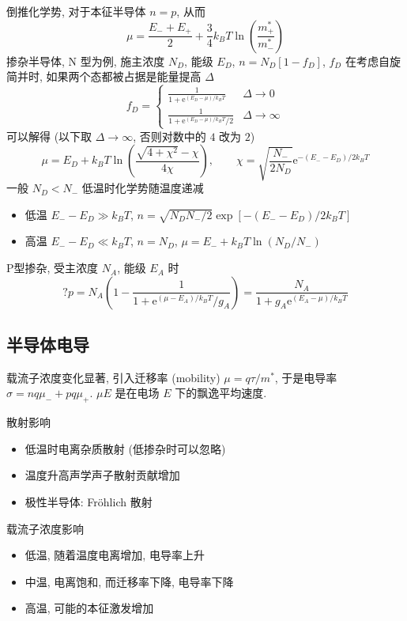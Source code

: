 \documentclass[11pt,a4paper]{article}%
\numberwithin{equation}{section}%
\newcommand\e{\mathrm{e}}%
\begin{document}
倒推化学势, 对于本征半导体 $n=p$, 从而
\begin{equation}
	\mu = \frac{E_- + E_+}{2} + \frac 34k_BT\ln\left(\frac{m^*_+}{m^*_-}\right)
\end{equation}
掺杂半导体, N 型为例, 施主浓度 $N_D$, 能级 $E_D$, $n = N_D[1-f_D]$, $f_D$ 在考虑自旋简并时, 如果两个态都被占据是能量提高 $\Delta$
\begin{equation}
	f_D = \begin{cases}
		\frac 1{1 + \e^{(E_D - \mu)/k_B T}}   &\Delta\to 0\\
		\frac 1{1 + \e^{(E_D - \mu)/k_B T}/2} &\Delta\to\infty
	\end{cases}
\end{equation}
可以解得 (以下取 $\Delta\to\infty$, 否则对数中的 $4$ 改为 $2$)
\begin{equation}
	\mu = E_D + k_BT\ln\left(\frac{\sqrt{4+\chi^2} - \chi}{4\chi}\right),\qquad
	\chi = \sqrt{\frac{N_-}{2N_D}}\e^{-(E_- - E_D)/2k_B T}
\end{equation}
一般 $N_D < N_-$ 低温时化学势随温度递减
\begin{itemize}
	\item 低温 $E_- - E_D \gg k_B T$, $n = \sqrt{N_D N_-/2}\exp[-(E_- - E_D)/2k_B T]$
	\item 高温 $E_- - E_D \ll k_B T$, $n = N_D$, $\mu = E_- + k_B T\ln(N_D/N_-)$
\end{itemize}

P型掺杂, 受主浓度 $N_A$, 能级 $E_A$ 时
\begin{equation}?
	p = N_A\left(1-\frac{1}{1+\e^{(\mu-E_A)/k_B T}/g_A}\right) = \frac{N_A}{1+g_A\e^{(E_A-\mu)/k_B T}}
\end{equation}
\subsection{半导体电导} %
\label{sub:conduct_in_semi}
载流子浓度变化显著, 引入迁移率 (mobility) $\mu = q\tau/m^*$, 于是电导率$\sigma = nq\mu_- + pq\mu_+$. $\mu E$ 是在电场 $E$ 下的飘逸平均速度. 

散射影响
\begin{itemize}
	\item 低温时电离杂质散射 (低掺杂时可以忽略)
	\item 温度升高声学声子散射贡献增加
	\item 极性半导体: Fr\"ohlich 散射
\end{itemize}
载流子浓度影响
\begin{itemize}
	\item 低温, 随着温度电离增加, 电导率上升
	\item 中温, 电离饱和, 而迁移率下降, 电导率下降
	\item 高温, 可能的本征激发增加
\end{itemize}
\end{document}
